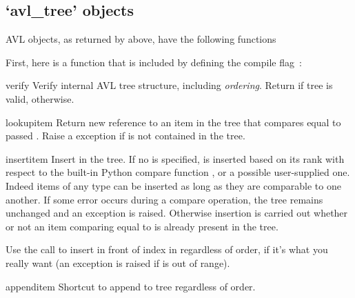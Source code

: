 \documentclass{howto}
\begin{document}
\subsection{`avl_tree' objects}
\label{avl-tree-objects}

\textsc{AVL} objects, as returned by  above, have the
following functions~

First, here is a function that is included by defining the  
 compile flag~:
\begin{methoddesc}{verify}{}
	Verify internal AVL tree structure, including \emph{ordering}.
	Return  if tree is valid,  otherwise.
\end{methoddesc}

\begin{methoddesc}{lookup}{item}
	Return new reference to an item in the tree that compares equal to passed 
	. Raise a  exception if  is
	not contained in the tree. 
\end{methoddesc}

\begin{methoddesc}{insert}{item}
	Insert  in the tree.  If no  is specified,
	 is inserted based on its rank with respect to the
	built-in Python compare function ,
	or a possible user-supplied one.  Indeed items of any type can be
	inserted as long as they are comparable to one another.  If some
	error occurs during a compare operation, the tree remains
	unchanged and an exception is raised.  Otherwise insertion is
	carried out whether or not an item comparing equal to 
	is already present in the tree.

	Use the call  to insert  in front of
	index  in  regardless of order, if it's what you
	really want (an  exception is raised if
	 is out of range).  
\end{methoddesc}

\begin{methoddesc}{append}{item}
	Shortcut to append  to tree regardless of order.
\end{methoddesc}
\end{document}
